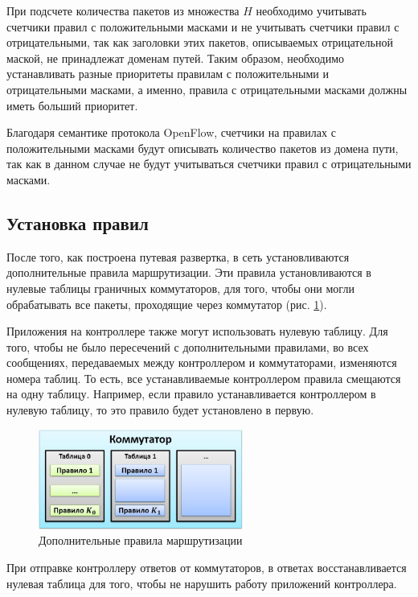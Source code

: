 \documentclass[../thesis.tex]{subfiles}
\begin{document}
При подсчете количества пакетов из множества $H$ необходимо учитывать счетчики правил с положительными масками и не учитывать счетчики правил с отрицательными, так как заголовки этих пакетов, описываемых отрицательной маской, не принадлежат доменам путей.
Таким образом, необходимо устанавливать разные приоритеты правилам с положительными и отрицательными масками, а именно, правила с отрицательными масками должны иметь больший приоритет.

Благодаря семантике протокола OpenFlow, счетчики на правилах с положительными масками будут описывать количество пакетов из домена пути, так как в данном случае не будут учитываться счетчики правил с отрицательными масками.

\subsection{Установка правил}

После того, как построена путевая развертка, в сеть установливаются дополнительные правила маршрутизации.
Эти правила установливаются в нулевые таблицы граничных коммутаторов, для того, чтобы они могли обрабатывать все пакеты, проходящие через коммутатор (рис. \ref{fig:additionalrules}).

Приложения на контроллере также могут использовать нулевую таблицу.
Для того, чтобы не было пересечений с дополнительными правилами, во всех сообщениях, передаваемых между контроллером и коммутаторами, изменяются номера таблиц.
То есть, все устанавливаемые контроллером правила смещаются на одну таблицу.
Например, если правило устанавливается контроллером в нулевую таблицу, то это правило будет установлено в первую.

\begin{figure}
\centering
\includegraphics[width=0.6\textwidth]{figures/additionalrules.jpg}
\caption{Дополнительные правила маршрутизации} \label{fig:additionalrules}
\end{figure}

При отправке контроллеру ответов от коммутаторов, в ответах восстанавливается нулевая таблица для того, чтобы не нарушить работу приложений контроллера.
\end{document}
